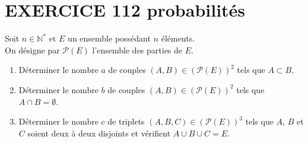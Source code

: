 \documentclass[10pt,oneside]{article}
\begin{document}
\begin{flushleft}
\begin{enumerate}
\end{enumerate}

\section*{EXERCICE 112 \:probabilités}


Soit $n\in\mathbb{N}^*$ et $E$ un ensemble possédant $n$ éléments.\\
On désigne par $\mathcal{P}(E)$ l'ensemble des parties de $E$.
\medskip
\begin{enumerate}
\item
Déterminer le nombre $a$ de couples $(A,B)\in \left(\mathcal{P}(E) \right)^2$ tels que $A\subset B $.
\item
Déterminer le nombre $b$ de couples $(A,B)\in \left(\mathcal{P}(E) \right)^2$ tels que $A\cap B=\emptyset $.
\item
Déterminer le nombre $c$ de triplets  $(A,B,C)\in \left(\mathcal{P}(E) \right)^3$ tels que $A$, $B$ et $C$ soient deux à deux disjoints et vérifient $A\cup B\cup C=E$.

 
\end{enumerate}

   

 





\end{flushleft}
\end{document}
